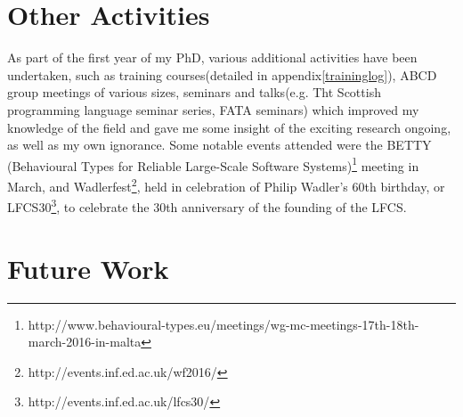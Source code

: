 

\section{Other Activities}
\label{sec:Activities}

As part of the first year of my PhD, various additional activities have been undertaken, such as training courses(detailed in appendix\ref{traininglog}), ABCD group meetings of various sizes, seminars and talks(e.g. Tht Scottish programming language seminar series, FATA seminars) which improved my knowledge of the field and gave me some insight of the exciting research ongoing, as well as my own ignorance. Some notable events attended were the BETTY (Behavioural Types for Reliable Large-Scale Software Systems)\footnote{http://www.behavioural-types.eu/meetings/wg-mc-meetings-17th-18th-march-2016-in-malta} meeting in March, and Wadlerfest\footnote{http://events.inf.ed.ac.uk/wf2016/}, held in celebration of Philip Wadler's 60th birthday, or LFCS30\footnote{http://events.inf.ed.ac.uk/lfcs30/}, to celebrate the 30th anniversary of the founding of the LFCS.


\section{Future Work}
\label{sec:future}

